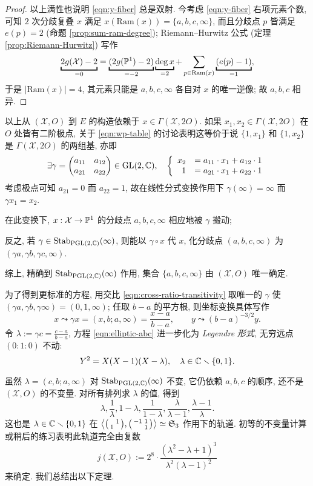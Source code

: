 \begin{proof}
	以上满性也说明 \eqref{eqn:y-fiber} 总是双射. 今考虑 \eqref{eqn:y-fiber} 右项元素个数, 可知 $2$ 次分歧复叠 $x$ 满足 $x\left(\mathrm{Ram}(x)\right) = \{a,b,c,\infty\}$, 而且分歧点 $p$ 皆满足 $e(p) = 2$ (命题 \ref{prop:sum-ram-degree}); Riemann--Hurwitz 公式 (定理 \ref{prop:Riemann-Hurwitz}) 写作
	\[ \underbracket{2g(\mathcal{X}) - 2}_{= 0} = \underbracket{(2g(\PP^1) - 2)}_{= -2} \underbracket{\deg x}_{= 2} + \sum_{p \in \text{Ram}(x)} \underbracket{(e(p) - 1)}_{= 1}, \]
	于是 $|\text{Ram}(x)| = 4$, 其元素只能是 $a,b,c,\infty$ 各自对 $x$ 的唯一逆像; 故 $a, b, c$ 相异.
\end{proof}

以上从 $(\mathcal{X}, O)$ 到 $E$ 的构造依赖于 $x \in \Gamma(\mathcal{X}, 2O)$. 如果 $x_1, x_2 \in \Gamma(\mathcal{X}, 2O)$ 在 $O$ 处皆有二阶极点, 关于 \eqref{eqn:wp-table} 的讨论表明这等价于说 $\{1, x_1\}$ 和 $\{1, x_2\}$ 是 $\Gamma(\mathcal{X}, 2O)$ 的两组基, 亦即
\[ \exists \gamma = \begin{pmatrix} a_{11} & a_{12} \\ a_{21} & a_{22} \end{pmatrix} \in \operatorname{GL}(2,\mathbb{C}), \quad
	\left\{\begin{array}{rl}
		x_2 & = a_{11} \cdot x_1 + a_{12} \cdot 1 \\
		1 & = a_{21} \cdot x_1 + a_{22} \cdot 1
	\end{array}\right. \]
考虑极点可知 $a_{21} = 0$ 而 $a_{22} = 1$, 故在线性分式变换作用下 $\gamma(\infty) = \infty$ 而 $\gamma x_1 = x_2$.
\begin{compactitem}
	\item 在此变换下, $x: \mathcal{X} \to \mathbb{P}^1$ 的分歧点 $a, b, c, \infty$ 相应地被 $\gamma$ 搬动;
	\item 反之, 若 $\gamma \in \operatorname{Stab}_{\operatorname{PGL}(2,\mathbb{C})}(\infty)$, 则能以 $\gamma \circ x$ 代 $x$, 化分歧点 $(a,b,c,\infty)$ 为 $(\gamma a, \gamma b, \gamma c, \infty)$.
\end{compactitem}
综上, 精确到 $\operatorname{Stab}_{\operatorname{PGL}(2,\mathbb{C})}(\infty)$ 作用, 集合 $\{a,b,c,\infty\}$ 由 $(\mathcal{X}, O)$ 唯一确定.

为了得到更标准的方程, 用交比 \eqref{eqn:cross-ratio-transitivity} 取唯一的 $\gamma$ 使 $(\gamma a, \gamma b, \gamma \infty) = (0,1,\infty)$; 任取 $b-a$ 的平方根, 则坐标变换具体写作
\[ x \leadsto \gamma x = (x,b;a,\infty) = \frac{x-a}{b-a}, \qquad y \leadsto (b-a)^{-3/2} y. \]
令 $\lambda := \gamma c = \frac{c-a}{b-a}$, 方程 \eqref{eqn:elliptic-abc} 进一步化为 \emph{Legendre 形式}, 无穷远点 $(0:1:0)$ 不动:
\[ Y^2 = X(X-1)(X-\lambda), \quad \lambda \in \mathbb{C} \smallsetminus \{0,1\}. \]

虽然 $\lambda = (c, b; a, \infty)$ 对 $\operatorname{Stab}_{\operatorname{PGL}(2,\mathbb{C})}(\infty)$ 不变, 它仍依赖 $a,b,c$ 的顺序, 还不是 $(\mathcal{X}, O)$ 的不变量. 对所有排列求 $\lambda$ 的值, 得到
\[ \lambda, \frac{1}{\lambda}, 1-\lambda, \frac{1}{1-\lambda}, \frac{\lambda}{\lambda-1}, \frac{\lambda-1}{\lambda}. \]
这也是 $\lambda \in \mathbb{C} \smallsetminus \{0,1\}$ 在 $\left\langle  \bigl(\begin{smallmatrix}  & 1 \\ 1 &  \end{smallmatrix}\bigr), \bigl(\begin{smallmatrix} -1 & 1 \\  & 1 \end{smallmatrix}\bigr)  \right\rangle \simeq \mathfrak{S}_3$ 作用下的轨道. 初等的不变量计算或稍后的练习表明此轨道完全由复数
\begin{equation}\label{eqn:j-genus-0}
	j(\mathcal{X}, O) := 2^8 \cdot \dfrac{(\lambda^2 - \lambda + 1)^3}{\lambda^2(\lambda-1)^2}
\end{equation}
来确定. 我们总结出以下定理.

